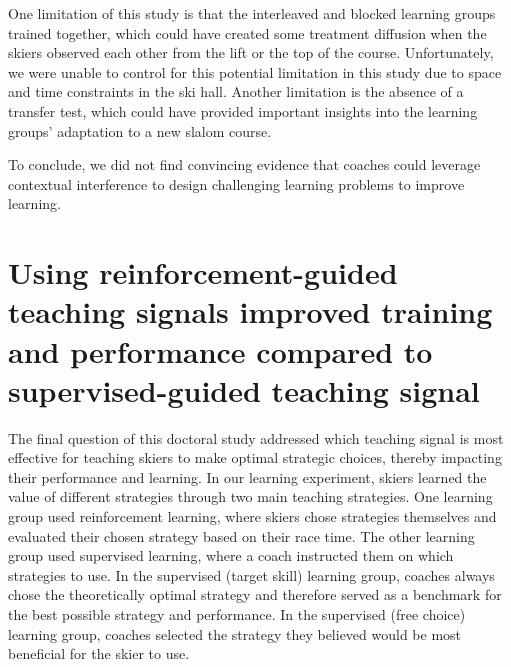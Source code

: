 One limitation of this study is that the interleaved and blocked learning groups trained together, which could have created some treatment diffusion when the skiers observed each other from the lift or the top of the course. Unfortunately, we were unable to control for this potential limitation in this study due to space and time constraints in the ski hall. Another limitation is the absence of a transfer test, which could have provided important insights into the learning groups’ adaptation to a new slalom course.

To conclude, we did not find convincing evidence that coaches could leverage contextual interference to design challenging learning problems to improve learning.

\section{Using reinforcement-guided teaching signals improved training and performance compared to supervised-guided teaching signal}
The final question of this doctoral study addressed which teaching signal is most effective for teaching skiers to make optimal strategic choices, thereby impacting their performance and learning. In our learning experiment, skiers learned the value of different strategies through two main teaching strategies. One learning group used reinforcement learning, where skiers chose strategies themselves and evaluated their chosen strategy based on their race time. The other learning group used supervised learning, where a coach instructed them on which strategies to use. In the supervised (target skill) learning group, coaches always chose the theoretically optimal strategy and therefore served as a benchmark for the best possible strategy and performance. In the supervised (free choice) learning group, coaches selected the strategy they believed would be most beneficial for the skier to use.




